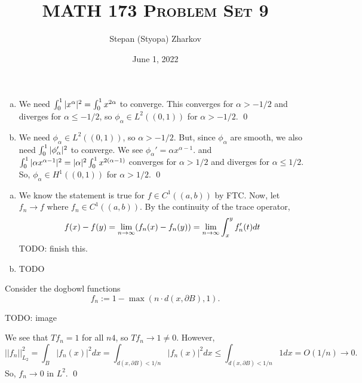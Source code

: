 \documentclass{article}
\title{\textsc{MATH 173 Problem Set 9}}
\author{Stepan (Styopa) Zharkov}
\date{June 1, 2022}
\renewcommand{\d}{\partial}
\begin{document}
\maketitle
{} 
\tri
\hop 
\solution

\newpage
{} 
\tri
\hop 
\solution
\begin{enumerate}[(a)]
    \item We need $\int_0^1 |x^\alpha|^2 = \int_0^1 x^{2\alpha}$ to converge. This converges for $\alpha > -1/2$ and diverges for $\alpha \le -1/2$, so $\phi_\alpha \in L^2((0,1))$ for $\alpha > -1/2$. \qed
    \item We need $\phi_\alpha \in L^2((0,1))$, so $\alpha > -1/2$. But, since $\phi_\alpha$ are smooth, we also need $\int_0^1 |\phi_\alpha ' |^2$ to converge. We see $\phi_\alpha' = \alpha x^{\alpha-1}$. and $\int_0^1 |\alpha x^{\alpha-1}|^2 = |\alpha|^2\int_0^1 x^{2(\alpha-1)}$ converges for $\alpha > 1/2$ and diverges for $\alpha \le 1/2$. So, $\phi_\alpha \in H^1((0,1))$ for $\alpha > 1/2$. \qed
\end{enumerate}

\newpage
{} 
\tri
\hop 
\solution
\begin{enumerate}[(a)]
    \item We know the statement is true for $f \in C^1((a,b))$ by FTC. Now, let $f_n \to f$ where $f_n \in C^1((a,b))$. By the continuity of the trace operator, 
    \[f(x) - f(y) = {\lim_{n \to \infty}} (f_n(x)-f_n(y)) = {\lim_{n \to \infty}} \int_x^yf_n'(t)dt\]
    TODO: finish this.
    \item TODO
\end{enumerate}

\newpage
{} 
\tri
\hop 
\solution

\newpage
{} 
\tri
\hop 
\solution Consider the dogbowl functions 
\[f_n := 1-\max(n\cdot d(x, \d B), 1).\]

TODO: image

We see that $Tf_n = 1$ for all $n4$, so $Tf_n \to 1 \ne 0$. However, 
\[||f_n||_{L_2}^2 = \int_B |f_n(x)|^2dx = \int_{d(x,\d B)< 1/n} |f_n(x)|^2dx \le  \int_{d(x,\d B)< 1/n} 1 dx  = O(1/n) \to 0.\]
So, $f_n \to 0$ in $L^2$. \qed
 
\newpage
{} 
\tri
\hop 
\solution

\newpage
{} 
\tri
\hop 
\solution
\end{document}
